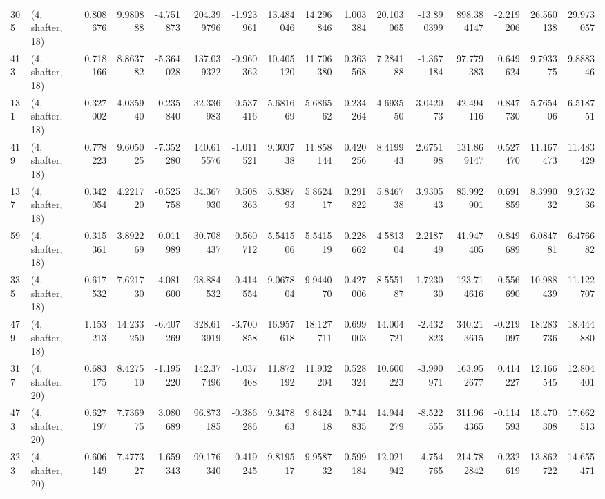 \begin{tabular}{llrrrrrrrrrrrrrr}
305 &  (4, shafter, 18) &   0.808676 &   9.980888 &  -4.751873 &   204.399796 &  -1.923961 &  13.484046 &  14.296846 &  1.003384 &  20.103065 & -13.890399 &   898.384147 & -2.219206 &  26.560138 &  29.973057 \\
413 &  (4, shafter, 18) &   0.718166 &   8.863782 &  -5.364028 &   137.039322 &  -0.960362 &  10.405120 &  11.706380 &  0.363568 &   7.284188 &  -1.367184 &    97.779383 &  0.649624 &   9.793375 &   9.888346 \\
131 &  (4, shafter, 18) &   0.327002 &   4.035940 &   0.235840 &    32.336983 &   0.537416 &   5.681669 &   5.686562 &  0.234264 &   4.693550 &   3.042073 &    42.494116 &  0.847730 &   5.765406 &   6.518751 \\
419 &  (4, shafter, 18) &   0.778223 &   9.605025 &  -7.352280 &   140.615576 &  -1.011521 &   9.303738 &  11.858144 &  0.420256 &   8.419943 &   2.675198 &   131.869147 &  0.527470 &  11.167473 &  11.483429 \\
137 &  (4, shafter, 18) &   0.342054 &   4.221720 &  -0.525758 &    34.367930 &   0.508363 &   5.838793 &   5.862417 &  0.291822 &   5.846738 &   3.930543 &    85.992901 &  0.691859 &   8.399032 &   9.273236 \\
59  &  (4, shafter, 18) &   0.315361 &   3.892269 &   0.011989 &    30.708437 &   0.560712 &   5.541506 &   5.541519 &  0.228662 &   4.581304 &   2.218749 &    41.947405 &  0.849689 &   6.084781 &   6.476682 \\
335 &  (4, shafter, 18) &   0.617532 &   7.621730 &  -4.081600 &    98.884532 &  -0.414554 &   9.067804 &   9.944070 &  0.427006 &   8.555187 &   1.723030 &   123.714616 &  0.556690 &  10.988439 &  11.122707 \\
479 &  (4, shafter, 18) &   1.153213 &  14.233250 &  -6.407269 &   328.613919 &  -3.700858 &  16.957618 &  18.127711 &  0.699003 &  14.004721 &  -2.432823 &   340.213615 & -0.219097 &  18.283736 &  18.444880 \\
317 &  (4, shafter, 20) &   0.683175 &   8.427510 &  -1.195220 &   142.377496 &  -1.037468 &  11.872192 &  11.932204 &  0.528324 &  10.600223 &  -3.990971 &   163.952677 &  0.414227 &  12.166545 &  12.804401 \\
473 &  (4, shafter, 20) &   0.627197 &   7.736975 &   3.080689 &    96.873185 &  -0.386286 &   9.347863 &   9.842418 &  0.744835 &  14.944279 &  -8.522555 &   311.964365 & -0.114593 &  15.470308 &  17.662513 \\
323 &  (4, shafter, 20) &   0.606149 &   7.477327 &   1.659343 &    99.176340 &  -0.419245 &   9.819517 &   9.958732 &  0.599184 &  12.021942 &  -4.754765 &   214.782842 &  0.232619 &  13.862722 &  14.655471 \\

\end{tabular}
